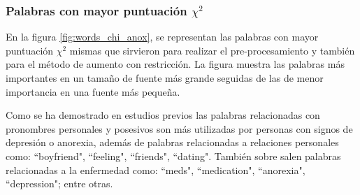 

\subsubsection{Palabras con mayor puntuación $\chi^2$}
En la figura \ref{fig:words_chi_anox}, se representan las palabras con mayor puntuación $\chi^2$ mismas que sirvieron para realizar el pre-procesamiento y también para el método de aumento con restricción. La figura muestra las palabras más importantes en un tamaño de fuente más grande seguidas de las de menor importancia en una fuente más pequeña. 

Como se ha demostrado en estudios previos las palabras relacionadas con pronombres personales y posesivos son más utilizadas por personas con signos de depresión o anorexia, además de palabras relacionadas a relaciones personales como: ``boyfriend", ``feeling", ``friends", ``dating". También sobre salen palabras relacionadas a la enfermedad como: ``meds", ``medication", ``anorexia", ``depression"; entre otras.








